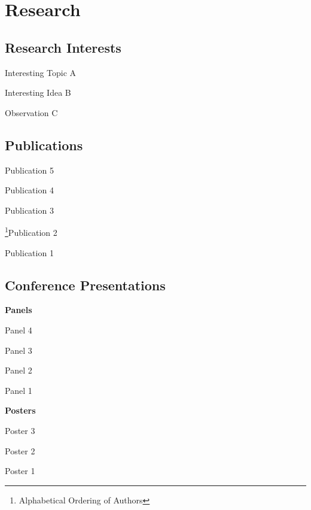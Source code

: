 \documentclass[letterpaper,11pt]{CV} %
\begin{document}

\section{Research}

\subsection{Research Interests}

Interesting Topic A

Interesting Idea B

Observation C

\subsection{Publications}

\begin{etaremune}[topsep = -2pt,itemsep = -2pt, leftmargin=.78cm]
	\item Publication 5
	\item Publication 4
	\item Publication 3
	\item \footnote[2]{\label{alpha}Alphabetical Ordering of Authors}Publication 2
	\item {}Publication 1
\end{etaremune}

\subsection{Conference Presentations}

\textbf{Panels}

\begin{etaremune}[topsep = -2pt,itemsep = -2pt, leftmargin=.78cm]
	\item Panel 4
	\item Panel 3
	\item Panel 2
	\item Panel 1
\end{etaremune}


\vspace{0.3cm}

\textbf{Posters}

\begin{etaremune}[topsep = -2pt,itemsep = -2pt, leftmargin=.78cm]
	\item Poster 3
	\item Poster 2
	\item Poster 1
\end{etaremune}
\end{document}
